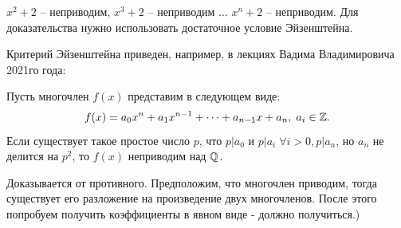 \begin{example}
    $x^2 + 2$ -- неприводим, $x^3 + 2$ -- неприводим $\dots $ $x^n + 2$ -- неприводим. Для 
    доказательства нужно использовать достаточное условие Эйзенштейна.
\end{example}

\begin{remarkfrom}
Критерий Эйзенштейна приведен, например, в лекциях Вадима Владимировича 2021го года:

Пусть многочлен $f(x)$ представим в следующем виде: 
$$f(x) = a_0x^n + a_1x^{n - 1} + \dots + a_{n - 1}x + a_n, \; a_i \in \mathbb{Z}.$$ 
Если существует такое простое число $p$, что $p \vert a_0$ и $p \vert a_i \; \forall i > 0, p \vert a_n$, но $a_n$ не делится на $p^2$, то $f(x)$ неприводим над $\mathbb{Q}$. 
\end{remarkfrom}

\begin{idea}
    Доказывается от противного. Предположим, что многочлен приводим, тогда существует его разложение 
    на произведение двух многочленов. После этого попробуем получить коэффициенты в явном виде - должно получиться.)
\end{idea}
